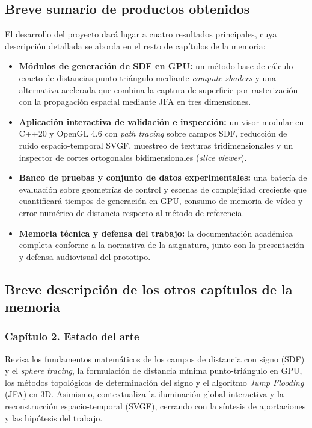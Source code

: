 \subsection{Breve sumario de productos obtenidos}

El desarrollo del proyecto dará lugar a cuatro resultados principales, cuya descripción detallada se aborda en el resto de capítulos de la memoria:

\begin{itemize}
  \item \textbf{Módulos de generación de SDF en GPU:} un método base de cálculo exacto de distancias punto-triángulo mediante \textit{compute shaders} y una alternativa acelerada que combina la captura de superficie por rasterización con la propagación espacial mediante JFA en tres dimensiones.
  \item \textbf{Aplicación interactiva de validación e inspección:} un visor modular en C++20 y OpenGL 4.6 con \textit{path tracing} sobre campos SDF, reducción de ruido espacio-temporal SVGF, muestreo de texturas tridimensionales y un inspector de cortes ortogonales bidimensionales (\textit{slice viewer}).
  \item \textbf{Banco de pruebas y conjunto de datos experimentales:} una batería de evaluación sobre geometrías de control y escenas de complejidad creciente que cuantificará tiempos de generación en GPU, consumo de memoria de vídeo y error numérico de distancia respecto al método de referencia.
  \item \textbf{Memoria técnica y defensa del trabajo:} la documentación académica completa conforme a la normativa de la asignatura, junto con la presentación y defensa audiovisual del prototipo.
\end{itemize}

\subsection{Breve descripción de los otros capítulos de la memoria}

\subsubsection{Capítulo 2. Estado del arte}

Revisa los fundamentos matemáticos de los campos de distancia con signo (SDF) y el \textit{sphere tracing}, la formulación de distancia mínima punto-triángulo en GPU, los métodos topológicos de determinación del signo y el algoritmo \textit{Jump Flooding} (JFA) en 3D. Asimismo, contextualiza la iluminación global interactiva y la reconstrucción espacio-temporal (SVGF), cerrando con la síntesis de aportaciones y las hipótesis del trabajo.

